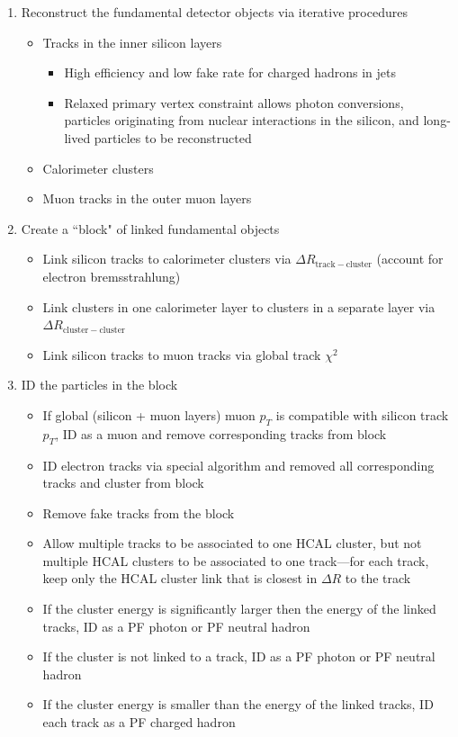 \documentclass[dissertation.tex]{subfiles}
\begin{document}
\begin{enumerate}
\item Reconstruct the fundamental detector objects via iterative procedures
\begin{itemize}
\item Tracks in the inner silicon layers
\begin{itemize}
\item High efficiency and low fake rate for charged hadrons in jets
\item Relaxed primary vertex constraint allows photon conversions, particles originating from nuclear interactions in the silicon, and long-lived particles to be reconstructed
\end{itemize}
\item Calorimeter clusters
\item Muon tracks in the outer muon layers
\end{itemize}
\item Create a ``block" of linked fundamental objects
\begin{itemize}
\item Link silicon tracks to calorimeter clusters via $\Delta R_{\mathrm{track-cluster}}$ (account for electron bremsstrahlung)
\item Link clusters in one calorimeter layer to clusters in a separate layer via $\Delta R_{\mathrm{cluster-cluster}}$
\item Link silicon tracks to muon tracks via global track $\chi^{2}$
\end{itemize}
\item ID the particles in the block
\begin{itemize}
\item If global (silicon + muon layers) muon $p_{T}$ is compatible with silicon track $p_{T}$, ID as a muon and remove corresponding tracks from block
\item ID electron tracks via special algorithm and removed all corresponding tracks and cluster from block
\item Remove fake tracks from the block
\item Allow multiple tracks to be associated to one HCAL cluster, but not multiple HCAL clusters to be associated to one track---for each track, keep only the HCAL cluster link that is closest in $\Delta R$ to the track
\item If the cluster energy is significantly larger then the energy of the linked tracks, ID as a PF photon or PF neutral hadron
\item If the cluster is not linked to a track, ID as a PF photon or PF neutral hadron
\item If the cluster energy is smaller than the energy of the linked tracks, ID each track as a PF charged hadron
\end{itemize}
\end{enumerate}
\end{document}
